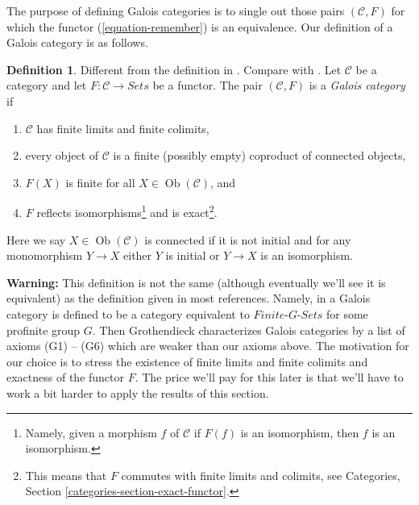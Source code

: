 \documentclass{stacks-project}
\newenvironment{reference}{\comment}{\endcomment}
\theoremstyle{plain}
\theoremstyle{definition}
\newtheorem{definition}[subsection]{Definition}
\theoremstyle{remark}
\numberwithin{equation}{subsection}
\def\Ob{\mathop{\mathrm{Ob}}\nolimits}
\begin{document}
\noindent
The purpose of defining Galois categories is to single out those
pairs $(\mathcal{C}, F)$ for which the functor (\ref{equation-remember})
is an equivalence. Our definition of a Galois category is as follows.

\begin{definition}
\label{definition-galois-category}
\begin{reference}
Different from the definition in \cite[Expos\'e V, Definition 5.1]{SGA1}.
Compare with \cite[Definition 7.2.1]{BS}.
\end{reference}
Let $\mathcal{C}$ be a category and let $F : \mathcal{C} \to \textit{Sets}$
be a functor. The pair $(\mathcal{C}, F)$ is a {\it Galois category} if
\begin{enumerate}
\item $\mathcal{C}$ has finite limits and finite colimits,
\item
\label{item-connected-components}
every object of $\mathcal{C}$ is a finite (possibly empty)
coproduct of connected objects,
\item $F(X)$ is finite for all $X \in \Ob(\mathcal{C})$, and
\item $F$ reflects isomorphisms\footnote{Namely, given a morphism
$f$ of $\mathcal{C}$ if $F(f)$ is an isomorphism, then
$f$ is an isomorphism.} and is exact\footnote{This means that
$F$ commutes with finite limits and colimits, see
Categories, Section \ref{categories-section-exact-functor}.}.
\end{enumerate}
Here we say $X \in \Ob(\mathcal{C})$ is connected if
it is not initial and for any monomorphism $Y \to X$
either $Y$ is initial or $Y \to X$ is an isomorphism.
\end{definition}

\noindent
{\bf Warning:} This definition is not the same (although eventually we'll
see it is equivalent) as the definition given in most references.
Namely, in \cite[Expos\'e V, Definition 5.1]{SGA1} a Galois category is
defined to be a category equivalent to $\textit{Finite-}G\textit{-Sets}$
for some profinite group $G$. Then Grothendieck characterizes
Galois categories by a list of axioms (G1) -- (G6) which are weaker
than our axioms above. The motivation for our choice is to stress the
existence of finite limits and finite colimits and exactness of the
functor $F$. The price we'll pay for this later is that we'll have
to work a bit harder to apply the results of this section.
\end{document}
